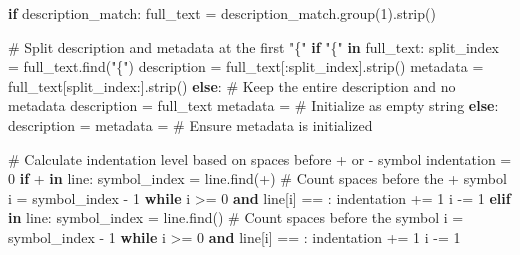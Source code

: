 \documentclass[
  11pt,
  letterpaper,
]{book}
\newenvironment{Shaded}{\begin{snugshade}}{\end{snugshade}}
\newcommand{\CommentTok}[1]{\textcolor[rgb]{0.37,0.37,0.37}{#1}}
\newcommand{\ControlFlowTok}[1]{\textcolor[rgb]{0.00,0.23,0.31}{\textbf{#1}}}
\newcommand{\DecValTok}[1]{\textcolor[rgb]{0.68,0.00,0.00}{#1}}
\newcommand{\KeywordTok}[1]{\textcolor[rgb]{0.00,0.23,0.31}{\textbf{#1}}}
\newcommand{\NormalTok}[1]{\textcolor[rgb]{0.00,0.23,0.31}{#1}}
\newcommand{\OperatorTok}[1]{\textcolor[rgb]{0.37,0.37,0.37}{#1}}
\newcommand{\StringTok}[1]{\textcolor[rgb]{0.13,0.47,0.30}{#1}}
\begin{document}
\begin{Shaded}
\begin{Highlighting}[]
        \ControlFlowTok{if}\NormalTok{ description\_match:}
\NormalTok{            full\_text }\OperatorTok{=}\NormalTok{ description\_match.group(}\DecValTok{1}\NormalTok{).strip()}

            \CommentTok{\# Split description and metadata at the first "\{"}
            \ControlFlowTok{if} \StringTok{"\{"} \KeywordTok{in}\NormalTok{ full\_text:}
\NormalTok{                split\_index }\OperatorTok{=}\NormalTok{ full\_text.find(}\StringTok{"\{"}\NormalTok{)}
\NormalTok{                description }\OperatorTok{=}\NormalTok{ full\_text[:split\_index].strip()}
\NormalTok{                metadata }\OperatorTok{=}\NormalTok{ full\_text[split\_index:].strip()}
            \ControlFlowTok{else}\NormalTok{:}
                \CommentTok{\# Keep the entire description and no metadata}
\NormalTok{                description }\OperatorTok{=}\NormalTok{ full\_text}
\NormalTok{                metadata }\OperatorTok{=} \StringTok{\textquotesingle{}\textquotesingle{}}  \CommentTok{\# Initialize as empty string}
        \ControlFlowTok{else}\NormalTok{:}
\NormalTok{            description }\OperatorTok{=} \StringTok{\textquotesingle{}\textquotesingle{}}
\NormalTok{            metadata }\OperatorTok{=} \StringTok{\textquotesingle{}\textquotesingle{}}  \CommentTok{\# Ensure metadata is initialized}

        \CommentTok{\# Calculate indentation level based on spaces before + or {-} symbol}
\NormalTok{        indentation }\OperatorTok{=} \DecValTok{0}
        \ControlFlowTok{if} \StringTok{\textquotesingle{}+\textquotesingle{}} \KeywordTok{in}\NormalTok{ line:}
\NormalTok{            symbol\_index }\OperatorTok{=}\NormalTok{ line.find(}\StringTok{\textquotesingle{}+\textquotesingle{}}\NormalTok{)}
            \CommentTok{\# Count spaces before the \textquotesingle{}+\textquotesingle{} symbol}
\NormalTok{            i }\OperatorTok{=}\NormalTok{ symbol\_index }\OperatorTok{{-}} \DecValTok{1}
            \ControlFlowTok{while}\NormalTok{ i }\OperatorTok{\textgreater{}=} \DecValTok{0} \KeywordTok{and}\NormalTok{ line[i] }\OperatorTok{==} \StringTok{\textquotesingle{} \textquotesingle{}}\NormalTok{:}
\NormalTok{                indentation }\OperatorTok{+=} \DecValTok{1}
\NormalTok{                i }\OperatorTok{{-}=} \DecValTok{1}
        \ControlFlowTok{elif} \StringTok{\textquotesingle{}{-}\textquotesingle{}} \KeywordTok{in}\NormalTok{ line:}
\NormalTok{            symbol\_index }\OperatorTok{=}\NormalTok{ line.find(}\StringTok{\textquotesingle{}{-}\textquotesingle{}}\NormalTok{)}
            \CommentTok{\# Count spaces before the \textquotesingle{}{-}\textquotesingle{} symbol}
\NormalTok{            i }\OperatorTok{=}\NormalTok{ symbol\_index }\OperatorTok{{-}} \DecValTok{1}
            \ControlFlowTok{while}\NormalTok{ i }\OperatorTok{\textgreater{}=} \DecValTok{0} \KeywordTok{and}\NormalTok{ line[i] }\OperatorTok{==} \StringTok{\textquotesingle{} \textquotesingle{}}\NormalTok{:}
\NormalTok{                indentation }\OperatorTok{+=} \DecValTok{1}
\NormalTok{                i }\OperatorTok{{-}=} \DecValTok{1}


\end{Highlighting}
\end{Shaded}
\end{document}

